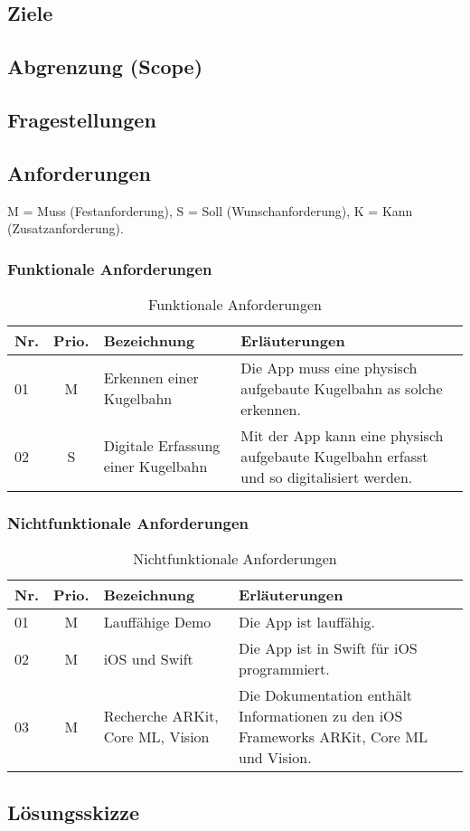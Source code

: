 \subsection{Ziele}

\subsection{Abgrenzung (Scope)}

\subsection{Fragestellungen}

\subsection{Anforderungen}
M = Muss (Festanforderung), S = Soll (Wunschanforderung), K = Kann (Zusatzanforderung).

\subsubsection{Funktionale Anforderungen}

\begin{table}
	\begin{tabular}{l c p{5cm} p{9cm}}
		\hline
		Nr. & Prio. & Bezeichnung & Erläuterungen \\
		\hline
		01 & M & Erkennen einer Kugelbahn & Die App muss eine physisch aufgebaute Kugelbahn as solche erkennen. \\
		02 & S & Digitale Erfassung einer Kugelbahn & Mit der App kann eine physisch aufgebaute Kugelbahn erfasst und so digitalisiert werden. \\
		\hline
	\end{tabular}
	\caption{Funktionale Anforderungen}
	\label{tab:funktionale-anforderungen}
\end{table}

\subsubsection{Nichtfunktionale Anforderungen}

\begin{table}
	\begin{tabular}{l c p{5cm} p{9cm}}
		\hline
		Nr. & Prio. & Bezeichnung & Erläuterungen \\
		\hline
		01 & M & Lauffähige Demo & Die App ist lauffähig. \\
		02 & M & iOS und Swift & Die App ist in Swift für iOS programmiert. \\
		03 & M & Recherche ARKit, Core ML, Vision & Die Dokumentation enthält Informationen zu den iOS Frameworks ARKit, Core ML und Vision. \\
		\hline
	\end{tabular}
	\caption{Nichtfunktionale Anforderungen}
	\label{tab:nichtfunktionale-anforderungen}
\end{table}

\subsection{Lösungsskizze}
